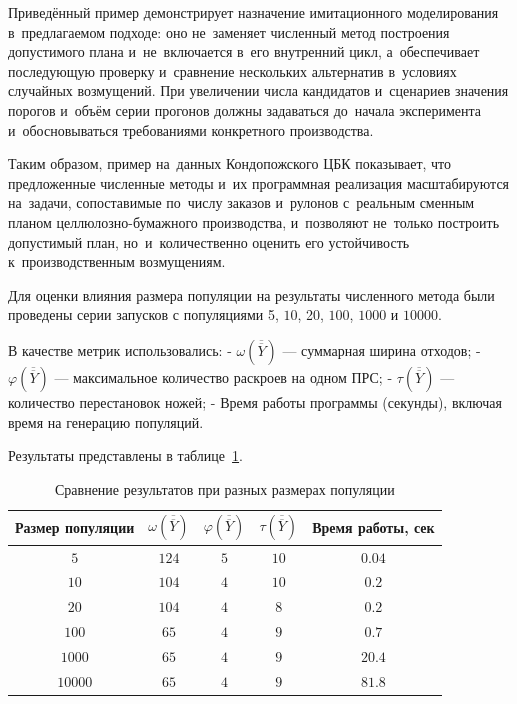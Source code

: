         Приведённый пример демонстрирует назначение имитационного моделирования в~предлагаемом подходе: оно не~заменяет численный метод построения допустимого плана и~не~включается в~его внутренний цикл, а~обеспечивает последующую проверку и~сравнение нескольких альтернатив в~условиях случайных возмущений. При увеличении числа кандидатов и~сценариев значения порогов и~объём серии прогонов должны задаваться до~начала эксперимента и~обосновываться требованиями конкретного производства.
        

Таким образом, пример на~данных Кондопожского ЦБК показывает, что предложенные численные методы и~их программная реализация масштабируются на~задачи, сопоставимые по~числу заказов и~рулонов с~реальным сменным планом целлюлозно-бумажного производства, и~позволяют не~только построить допустимый план, но~и~количественно оценить его устойчивость к~производственным возмущениям.


Для оценки влияния размера популяции на результаты численного метода были проведены серии запусков с популяциями 5, $10$, 20, $100$, $1000$ и $10000$.

 В качестве метрик использовались:
- $\omega(\overline{\overline{Y}})$ --- суммарная ширина отходов;
- $\varphi(\overline{\overline{Y}})$ --- максимальное количество раскроев на одном ПРС;
- $\tau(\overline{\overline{Y}})$ --- количество перестановок ножей;
- Время работы программы (секунды), включая время на генерацию популяций.
 
Результаты представлены в таблице~\ref{tab:populations}.

\begin{table}[h]
\centering
\caption{Сравнение результатов при разных размерах популяции}
\label{tab:populations}
\begin{tabular}{|c|c|c|c|c|}
\hline
Размер популяции & $\omega(\overline{\overline{Y}})$ & $\varphi(\overline{\overline{Y}})$ & $\tau(\overline{\overline{Y}})$ & Время работы, сек \\
\hline
$5$    & $124$ & $5$ & $10$ & $0.04$ \\
$10$    & $104$ & $4$ & $10$ & $0.2$ \\
$20$    & $104$ & $4$ & $8$ & $0.2$ \\
$100$   & $65$  & $4$ & $9$  & $0.7$ \\
$1000$  & $65$  & $4$ & $9$  & $20.4$ \\
$10000$ & $65$  & $4$ & $9$  & $81.8$ \\
\hline
\end{tabular}
\end{table}


